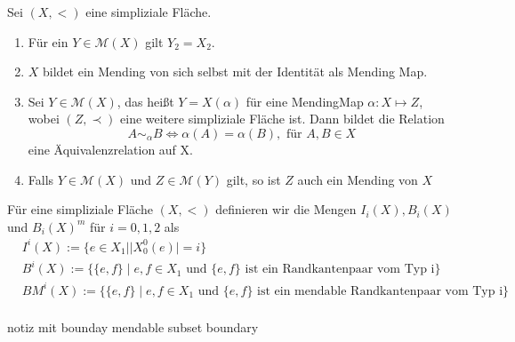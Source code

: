 \documentclass[12pt,titlepage]{article}
\begin{document}
  \begin{bemerkung}
  Sei $(X,<)$ eine simpliziale Fläche.
  \begin{enumerate}
  \item Für ein $Y \in \mathcal{M}(X)$ gilt $Y_2=X_2$.
  \item $X$ bildet ein Mending von sich selbst mit der Identität als Mending Map.
  \item Sei $Y\in \mathcal{M}(X)$, das heißt $Y=X(\alpha)$ für eine MendingMap $\alpha:X \mapsto Z$, wobei $(Z,\prec)$ eine weitere simpliziale Fläche ist. Dann bildet die Relation 
  \[
A\sim_\alpha B \Leftrightarrow \alpha(A)=\alpha(B),\text{ für }A,B \in X
  \]
  eine Äquivalenzrelation auf X.
  \item Falls $Y\in \mathcal{M}(X)$ und $Z \in \mathcal{M}(Y)$ gilt, so ist $Z$ auch ein Mending von $X$
  \end{enumerate}
  \end{bemerkung}
  
  \begin{definition}
  Für eine simpliziale Fläche $(X,<)$ definieren wir die Mengen $I_{i}(X),B_{i}(X)$ und $B_{i}(X)^m$ für $i=0,1,2$ als
  \begin{align*}
  &I^i(X):=\{e \in X_1 \mid \vert X_{0}^{0}(e)\vert=i\}\\
  &B^{i}(X):=\{\{e,f\} \mid e,f \in X_1 \text{ und }\{e,f\}\text{ ist ein Randkantenpaar vom Typ i}\}\\
  &BM^{i}(X):=\{\{e,f\} \mid e,f \in X_1 \text{ und }\{e,f\}\text{ ist ein mendable Randkantenpaar vom Typ i}\}\\
  \end{align*}
  \end{definition}
  
  \begin{bemerkung}
  notiz mit bounday mendable subset boundary
  \end{bemerkung}
  \newpage
\end{document}
